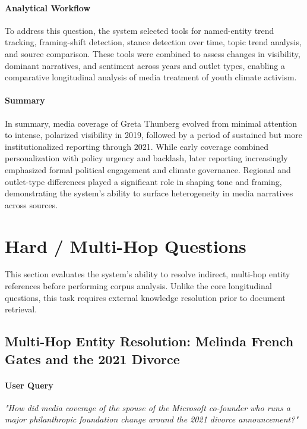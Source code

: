 \paragraph{Analytical Workflow}

To address this question, the system selected tools for named-entity trend tracking, framing-shift detection, stance detection over time, topic trend analysis, and source comparison. These tools were combined to assess changes in visibility, dominant narratives, and sentiment across years and outlet types, enabling a comparative longitudinal analysis of media treatment of youth climate activism.

\paragraph{Summary}

In summary, media coverage of Greta Thunberg evolved from minimal attention to intense, polarized visibility in 2019, followed by a period of sustained but more institutionalized reporting through 2021. While early coverage combined personalization with policy urgency and backlash, later reporting increasingly emphasized formal political engagement and climate governance. Regional and outlet-type differences played a significant role in shaping tone and framing, demonstrating the system’s ability to surface heterogeneity in media narratives across sources.

\section{Hard / Multi-Hop Questions}

This section evaluates the system’s ability to resolve indirect, multi-hop entity references before performing corpus analysis. Unlike the core longitudinal questions, this task requires external knowledge resolution prior to document retrieval.

\subsection{Multi-Hop Entity Resolution: Melinda French Gates and the 2021 Divorce}


\paragraph{User Query}

\textit{"How did media coverage of the spouse of the Microsoft co-founder who runs a major philanthropic foundation change around the 2021 divorce announcement?"}

